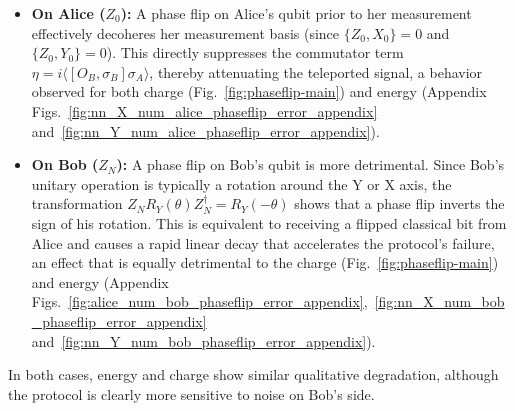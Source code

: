 \begin{itemize}
    \item \textbf{On Alice ($Z_0$):} A phase flip on Alice's qubit prior to her measurement effectively decoheres her measurement basis (since $\{Z_0, X_0\}=0$ and $\{Z_0, Y_0\}=0$). This directly suppresses the commutator term $\eta=i\langle[O_B, \sigma_B]\sigma_A\rangle$, thereby attenuating the teleported signal, a behavior observed for both charge (Fig.~\ref{fig:phaseflip-main}) and energy (Appendix Figs.~\ref{fig:nn_X_num_alice_phaseflip_error_appendix} and~\ref{fig:nn_Y_num_alice_phaseflip_error_appendix}).
    \item \textbf{On Bob ($Z_N$):} A phase flip on Bob's qubit is more detrimental. Since Bob's unitary operation is typically a rotation around the Y or X axis, the transformation $Z_N R_Y(\theta) Z_N^\dagger = R_Y(-\theta)$ shows that a phase flip inverts the sign of his rotation. This is equivalent to receiving a flipped classical bit from Alice and causes a rapid linear decay that accelerates the protocol's failure, an effect that is equally detrimental to the charge (Fig.~\ref{fig:phaseflip-main}) and energy (Appendix Figs.~\ref{fig:alice_num_bob_phaseflip_error_appendix},~\ref{fig:nn_X_num_bob_phaseflip_error_appendix} and~\ref{fig:nn_Y_num_bob_phaseflip_error_appendix}).
\end{itemize}

In both cases, energy and charge show similar qualitative degradation, although the protocol is clearly more sensitive to noise on Bob's side.

